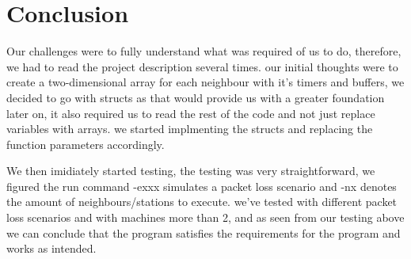 \section{Conclusion}
Our challenges were to fully understand what was required of us to do, therefore, we had to read the project description several times.
our initial thoughts were to create a two-dimensional array for each neighbour with it's timers and buffers, we decided to go with structs as
that would provide us with a greater foundation later on, it also required us to read the rest of the code and not just replace variables with arrays.
we started implmenting the structs and replacing the function parameters accordingly.

We then imidiately started testing, the testing was very straightforward,
we figured the run command -exxx simulates a packet loss scenario and -nx denotes the amount of neighbours/stations to execute.
we've tested with different packet loss scenarios and with machines more than 2,
and as seen from our testing above we can conclude that the program satisfies the requirements for the program and works as intended.
